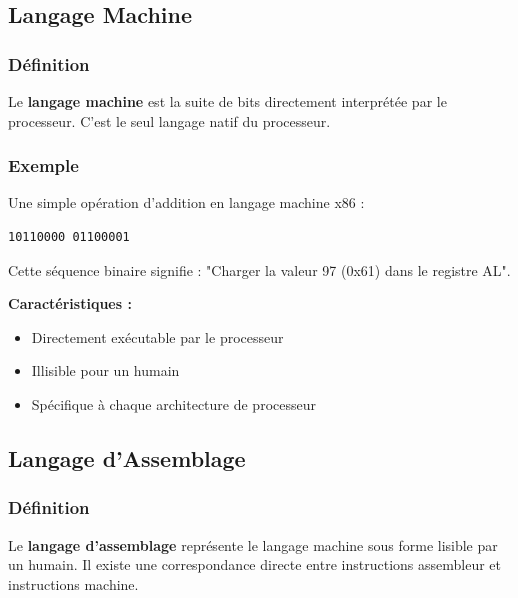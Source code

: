 \documentclass[12pt,a4paper]{article}
\begin{document}
\subsection{Langage Machine}

\subsubsection{Définition}

\begin{definition}
Le \textbf{langage machine} est la suite de bits directement interprétée par le processeur.  C'est le seul langage natif du processeur.
\end{definition}

\subsubsection{Exemple}

\begin{exemple}
Une simple opération d'addition en langage machine x86 :
\begin{verbatim}
10110000 01100001
\end{verbatim}

Cette séquence binaire signifie :  "Charger la valeur 97 (0x61) dans le registre AL". 
\end{exemple}

\begin{astuce}
\textbf{Caractéristiques : }
\begin{itemize}
    \item \textcolor{defvert}{Directement exécutable} par le processeur
    \item \textcolor{importantrouge}{Illisible} pour un humain
    \item \textcolor{algoviolet}{Spécifique} à chaque architecture de processeur
\end{itemize}
\end{astuce}

\subsection{Langage d'Assemblage}

\subsubsection{Définition}

\begin{definition}
Le \textbf{langage d'assemblage} représente le langage machine sous forme lisible par un humain.  Il existe une correspondance directe entre instructions assembleur et instructions machine.
\end{definition}
\end{document}
